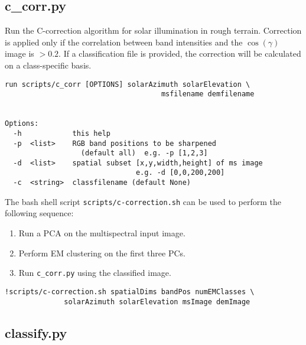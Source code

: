 \documentclass{paper}
\begin{document}
\subsection*{c\_corr.py}
Run the C-correction algorithm for solar illumination in rough terrain. Correction is applied only if the correlation between band intensities and the $\cos(\gamma)$ image is $> 0.2$. If a classification file is provided, the correction will be calculated on a class-specific basis.
\begin{verbatim}
run scripts/c_corr [OPTIONS] solarAzimuth solarElevation \
                                     msfilename demfilename


Options:
  -h            this help
  -p  <list>    RGB band positions to be sharpened
                  (default all)  e.g. -p [1,2,3]
  -d  <list>    spatial subset [x,y,width,height] of ms image
                               e.g. -d [0,0,200,200]
  -c  <string>  classfilename (default None)
\end{verbatim}
The bash shell script {\tt scripts/c-correction.sh} can be used to perform the following sequence:
\begin{enumerate}
\item Run a PCA on the multispectral input image.
\item Perform EM clustering on the first three PCs.
\item Run {\tt c\_corr.py} using the classified image.
\end{enumerate}
\begin{verbatim}
!scripts/c-correction.sh spatialDims bandPos numEMClasses \
              solarAzimuth solarElevation msImage demImage
\end{verbatim}





\subsection*{classify.py}
\end{document}
